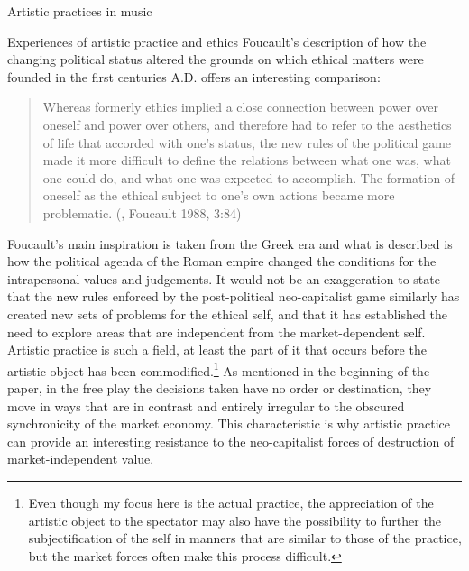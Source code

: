 \documentclass[presentation]{beamer}
\makeatletter
\newcommand{\cslcitation}[2]
 {\protect\hyper@linkstart{cite}{citeproc_bib_item_#1}#2\hyper@linkend}
\makeatother
\begin{document}
\begin{frame}[label={sec:org952e88c}]{Artistic practices in music}
\begin{block}{Experiences of artistic practice and ethics}
Foucault's description of how the changing political status altered the grounds on which ethical matters were founded in the first centuries A.D. offers an interesting comparison:
\begin{quote}
Whereas formerly ethics implied a close connection between power over oneself and power over others, and therefore had to refer to the aesthetics of life that accorded with one's status, the new rules of the political game made it more difficult to define the relations between what one was, what one could do, and what one was expected to accomplish. The formation of oneself as the ethical subject to one's own actions became more problematic. (, \cslcitation{7}{Foucault 1988, 3:84})
\end{quote}
Foucault's main inspiration is taken from the Greek era and what is described is how the political agenda of the Roman empire changed the conditions for the intrapersonal values and judgements.
It would not be an exaggeration to state that the new rules enforced by the post-political neo-capitalist game similarly has created new sets of problems for the ethical self, and that it has established the need to explore areas that are independent from the market-dependent self. Artistic practice is such a field, at least the part of it that occurs before the artistic object has been commodified.\footnote{Even though my focus here is the actual practice, the appreciation of the artistic object to the spectator may also have the possibility to further the subjectification of the self in manners that are similar to those of the practice, but the market forces often make this process difficult.} As mentioned in the beginning of the paper, in the free play the decisions taken have no order or destination, they move in ways that are in contrast and entirely irregular to the obscured synchronicity of the market economy. This characteristic is why artistic practice can provide an interesting resistance to the neo-capitalist forces of destruction of market-independent value.


\end{block}
\end{frame}
\end{document}
